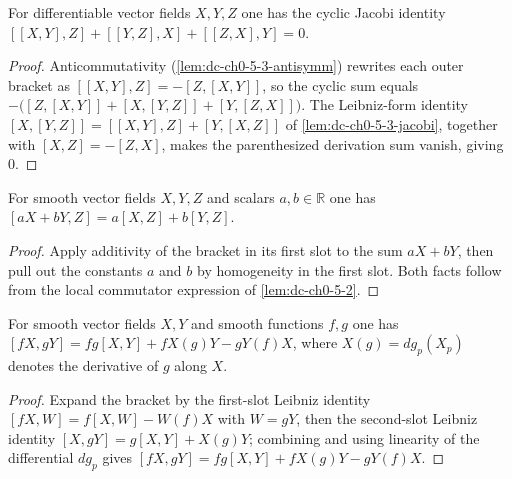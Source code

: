 \begin{lemma}
  \label{lem:dc-ch0-5-3-jacobi-cyclic}
  \leanok
  For differentiable vector fields $X,Y,Z$ one has the cyclic Jacobi identity
  $[[X,Y],Z]+[[Y,Z],X]+[[Z,X],Y]=0$.
\end{lemma}
\begin{proof}
  \sketch
  \leanok
  Anticommutativity (\cref{lem:dc-ch0-5-3-antisymm}) rewrites each outer bracket as
  $[[X,Y],Z]=-[Z,[X,Y]]$, so the cyclic sum equals
  $-\big([Z,[X,Y]]+[X,[Y,Z]]+[Y,[Z,X]]\big)$. The Leibniz-form identity
  $[X,[Y,Z]]=[[X,Y],Z]+[Y,[X,Z]]$ of \cref{lem:dc-ch0-5-3-jacobi}, together with
  $[X,Z]=-[Z,X]$, makes the parenthesized derivation sum vanish, giving $0$.
\end{proof}

\begin{lemma}
  \label{lem:dc-ch0-5-3-bilinear}
  \leanok
  For smooth vector fields $X,Y,Z$ and scalars $a,b\in\mathbb{R}$ one has
  $[aX+bY,Z]=a[X,Z]+b[Y,Z]$.
\end{lemma}
\begin{proof}
  \sketch
  \leanok
  Apply additivity of the bracket in its first slot to the sum $aX+bY$, then pull
  out the constants $a$ and $b$ by homogeneity in the first slot. Both facts follow
  from the local commutator expression of \cref{lem:dc-ch0-5-2}.
\end{proof}

\begin{lemma}
  \label{lem:dc-ch0-5-3-leibniz}
  \leanok
  For smooth vector fields $X,Y$ and smooth functions $f,g$ one has
  $[fX,gY]=fg[X,Y]+fX(g)Y-gY(f)X$, where $X(g)=dg_p(X_p)$ denotes the derivative
  of $g$ along $X$.
\end{lemma}
\begin{proof}
  \sketch
  \leanok
  Expand the bracket by the first-slot Leibniz identity
  $[fX,W]=f[X,W]-W(f)X$ with $W=gY$, then the second-slot Leibniz identity
  $[X,gY]=g[X,Y]+X(g)Y$; combining and using linearity of the differential
  $dg_p$ gives $[fX,gY]=fg[X,Y]+fX(g)Y-gY(f)X$.
\end{proof}

